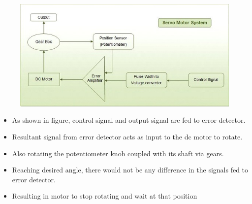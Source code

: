 \documentclass[table,10pt,red]{beamer}	%
\begin{document}
\begin{frame}
	\begin{figure}
		
		
		\includegraphics[width=\linewidth]{"Closed loop cs"}
	\end{figure} 
\end{frame}

\begin{frame}
	\begin{itemize}
		
		
		\item
		As shown in figure, control signal and output signal are fed to error detector.
		\pause
		\item
		Resultant signal from error detector acts as input to the dc motor to rotate.
		\pause
		\item
		Also rotating the potentiometer knob coupled with its shaft via gears.


		\pause
		\item
		Reaching desired angle, there would not be any difference in the signals fed to error detector.
		
		
		\pause
		\item
		Resulting in motor to stop rotating and wait at that position


	\end{itemize}
\end{frame}
\end{document}
